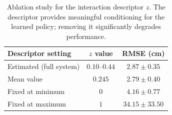 \begin{table}[t]
\footnotesize
\centering
\begin{tabular}{l c c}
\toprule
Descriptor setting & $z$ value & RMSE (cm) \\
\midrule
Estimated (full system) & $0.10$--$0.44$ & $2.87 \pm 0.35$ \\
Mean value              & $0.245$         & $2.79 \pm 0.40$ \\
Fixed at minimum        & $0$             & $4.16 \pm 0.77$ \\
Fixed at maximum        & $1$             & $34.15 \pm 33.50$ \\
\bottomrule
\end{tabular}
\caption{Ablation study for the interaction descriptor $z$. The descriptor provides meaningful conditioning for the learned policy; removing it significantly degrades performance.}
\label{tab:pho_ablation}
\end{table}
